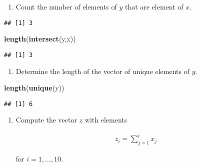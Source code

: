 \documentclass[]{article}
\newenvironment{Shaded}{\begin{snugshade}}{\end{snugshade}}
\newcommand{\KeywordTok}[1]{\textcolor[rgb]{0.13,0.29,0.53}{\textbf{#1}}}
\newcommand{\StringTok}[1]{\textcolor[rgb]{0.31,0.60,0.02}{#1}}
\newcommand{\OperatorTok}[1]{\textcolor[rgb]{0.81,0.36,0.00}{\textbf{#1}}}
\newcommand{\NormalTok}[1]{#1}
\providecommand{\tightlist}{%
  \setlength{\itemsep}{0pt}\setlength{\parskip}{0pt}}
\begin{document}
\begin{enumerate}
\def\labelenumi{\arabic{enumi}.}
\setcounter{enumi}{1}
\tightlist
\item
  Count the number of elements of \(y\) that are element of \(x\).
\end{enumerate}

\begin{Shaded}
\end{Shaded}

\begin{verbatim}
## [1] 3
\end{verbatim}

\begin{Shaded}
\begin{Highlighting}[]
\KeywordTok{length}\NormalTok{(}\KeywordTok{intersect}\NormalTok{(y,x))}
\end{Highlighting}
\end{Shaded}

\begin{verbatim}
## [1] 3
\end{verbatim}

\begin{enumerate}
\def\labelenumi{\arabic{enumi}.}
\setcounter{enumi}{2}
\tightlist
\item
  Determine the length of the vector of unique elements of \(y\).
\end{enumerate}

\begin{Shaded}
\begin{Highlighting}[]
\KeywordTok{length}\NormalTok{(}\KeywordTok{unique}\NormalTok{(y))}
\end{Highlighting}
\end{Shaded}

\begin{verbatim}
## [1] 6
\end{verbatim}

\begin{enumerate}
\def\labelenumi{\arabic{enumi}.}
\setcounter{enumi}{3}
\tightlist
\item
  Compute the vector \(z\) with elements

  \begin{align*}
  z_{i}=\sum_{j=1}^{i}x_{j}
  \end{align*}

  for \(i=1,\ldots ,10\).
\end{enumerate}
\end{document}

